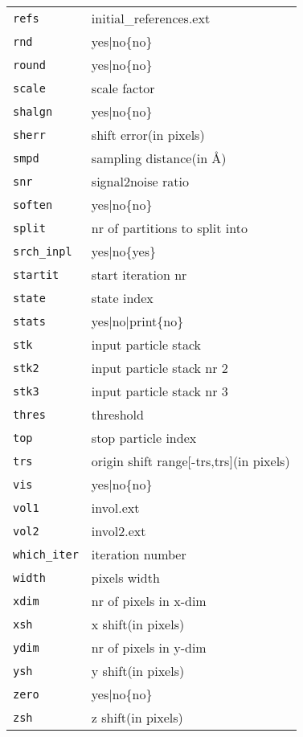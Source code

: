 \documentclass[a4paper,11pt]{article}
\begin{document}
\begin{tabular}{ll}
\texttt{refs}&{initial\_references.ext}\\
\texttt{rnd}&{yes|no\{no\}}\\
\texttt{round}&{yes|no\{no\}}\\
\texttt{scale}&{scale factor}\\
\texttt{shalgn}&{yes|no\{no\}}\\
\texttt{sherr}&{shift error(in pixels)}\\
\texttt{smpd}&{sampling distance(in \AA{})}\\
\texttt{snr}&{signal2noise ratio}\\
\texttt{soften}&{yes|no\{no\}}\\
\texttt{split}&{nr of partitions to split into}\\
\texttt{srch\_inpl}&{yes|no\{yes\}}\\
\texttt{startit}&{start iteration nr}\\
\texttt{state}&{state index}\\
\texttt{stats}&{yes|no|print\{no\}}\\
\texttt{stk}&{input particle stack}\\
\texttt{stk2}&{input particle stack nr 2}\\
\texttt{stk3}&{input particle stack nr 3}\\
\texttt{thres}&{threshold}\\
\texttt{top}&{stop particle index}\\
\texttt{trs}&{origin shift range[-trs,trs](in pixels)}\\
\texttt{vis}&{yes|no\{no\}}\\
\texttt{vol1}&{invol.ext}\\
\texttt{vol2}&{invol2.ext}\\
\texttt{which\_iter}&{iteration number}\\
\texttt{width}&{pixels width}\\
\texttt{xdim}&{nr of pixels in x-dim}\\
\texttt{xsh}&{x shift(in pixels)}\\
\texttt{ydim}&{nr of pixels in y-dim}\\
\texttt{ysh}&{y shift(in pixels)}\\
\texttt{zero}&{yes|no\{no\}}\\
\texttt{zsh}&{z shift(in pixels)}\\
\end{tabular}
\end{document}
